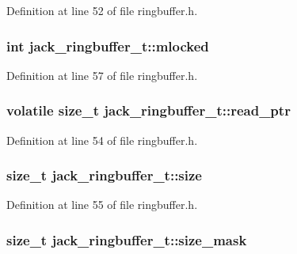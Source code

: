 \-Definition at line 52 of file ringbuffer.\-h.

\hypertarget{structjack__ringbuffer__t_ac33041ce67d9996804cba45d613018dc}{
\subsubsection[{mlocked}]{\setlength{\rightskip}{0pt plus 5cm}int {\bf jack\-\_\-ringbuffer\-\_\-t\-::mlocked}}}\label{df/d9b/structjack__ringbuffer__t_ac33041ce67d9996804cba45d613018dc}


\-Definition at line 57 of file ringbuffer.\-h.

\hypertarget{structjack__ringbuffer__t_a0bb413093ec1e3c3e957ddaa42ddf512}{
\subsubsection[{read\-\_\-ptr}]{\setlength{\rightskip}{0pt plus 5cm}volatile size\-\_\-t {\bf jack\-\_\-ringbuffer\-\_\-t\-::read\-\_\-ptr}}}\label{df/d9b/structjack__ringbuffer__t_a0bb413093ec1e3c3e957ddaa42ddf512}


\-Definition at line 54 of file ringbuffer.\-h.

\hypertarget{structjack__ringbuffer__t_ae0db038d5d6566e916f64166cfe60317}{
\subsubsection[{size}]{\setlength{\rightskip}{0pt plus 5cm}size\-\_\-t {\bf jack\-\_\-ringbuffer\-\_\-t\-::size}}}\label{df/d9b/structjack__ringbuffer__t_ae0db038d5d6566e916f64166cfe60317}


\-Definition at line 55 of file ringbuffer.\-h.

\hypertarget{structjack__ringbuffer__t_aa782cb7bf8312c7a04180685820b5ddd}{
\subsubsection[{size\-\_\-mask}]{\setlength{\rightskip}{0pt plus 5cm}size\-\_\-t {\bf jack\-\_\-ringbuffer\-\_\-t\-::size\-\_\-mask}}}\label{df/d9b/structjack__ringbuffer__t_aa782cb7bf8312c7a04180685820b5ddd}



